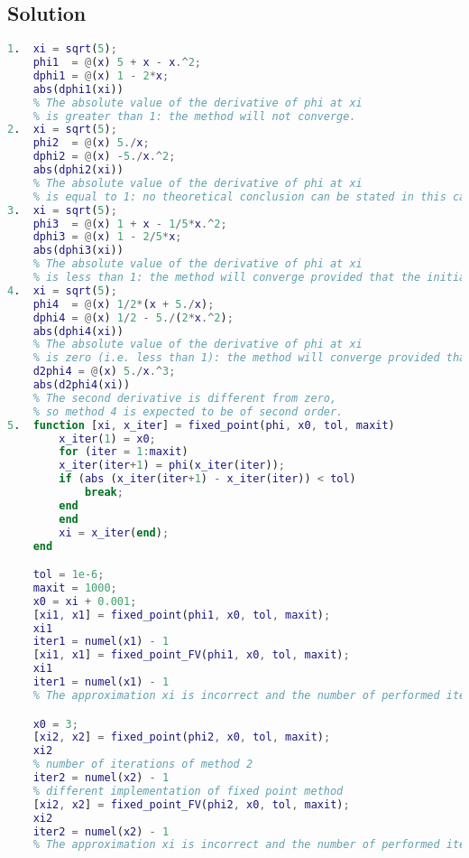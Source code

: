 \documentclass[12pt, a4paper]{report}
\begin{document}
    \subsection*{Solution}
        \begin{lstlisting}[language=Matlab]
1.  xi = sqrt(5);
    phi1  = @(x) 5 + x - x.^2;
    dphi1 = @(x) 1 - 2*x;
    abs(dphi1(xi))
    % The absolute value of the derivative of phi at xi
    % is greater than 1: the method will not converge.
2.  xi = sqrt(5);
    phi2  = @(x) 5./x;
    dphi2 = @(x) -5./x.^2;
    abs(dphi2(xi))
    % The absolute value of the derivative of phi at xi
    % is equal to 1: no theoretical conclusion can be stated in this case.
3.  xi = sqrt(5);
    phi3  = @(x) 1 + x - 1/5*x.^2;
    dphi3 = @(x) 1 - 2/5*x;
    abs(dphi3(xi))
    % The absolute value of the derivative of phi at xi
    % is less than 1: the method will converge provided that the initial guess x{(0)} is close enough to xi (local convergence).
4.  xi = sqrt(5);
    phi4  = @(x) 1/2*(x + 5./x);
    dphi4 = @(x) 1/2 - 5./(2*x.^2);
    abs(dphi4(xi))
    % The absolute value of the derivative of phi at xi
    % is zero (i.e. less than 1): the method will converge provided that the initial guess x{(0)} is close enough to xi (local convergence).
    d2phi4 = @(x) 5./x.^3;
    abs(d2phi4(xi))
    % The second derivative is different from zero,
    % so method 4 is expected to be of second order.
5.  function [xi, x_iter] = fixed_point(phi, x0, tol, maxit)
        x_iter(1) = x0;
        for (iter = 1:maxit)
        x_iter(iter+1) = phi(x_iter(iter));
        if (abs (x_iter(iter+1) - x_iter(iter)) < tol)
            break;
        end
        end
        xi = x_iter(end);
    end

    tol = 1e-6;
    maxit = 1000;
    x0 = xi + 0.001;
    [xi1, x1] = fixed_point(phi1, x0, tol, maxit);
    xi1
    iter1 = numel(x1) - 1
    [xi1, x1] = fixed_point_FV(phi1, x0, tol, maxit);
    xi1
    iter1 = numel(x1) - 1
    % The approximation xi is incorrect and the number of performed iterations is the maximum: as expected, the method did not converge.

    x0 = 3;
    [xi2, x2] = fixed_point(phi2, x0, tol, maxit);
    xi2
    % number of iterations of method 2
    iter2 = numel(x2) - 1
    % different implementation of fixed point method
    [xi2, x2] = fixed_point_FV(phi2, x0, tol, maxit);
    xi2
    iter2 = numel(x2) - 1
    % The approximation xi is incorrect and the number of performed iterations is the maximum: the method did not converge.


\end{lstlisting}
\end{document}
